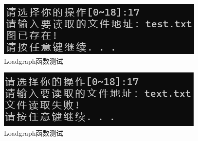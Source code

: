 \documentclass[supercite]{Experimental_Report}
\theoremstyle{definition}
\begin{document}
\begin{enumerate}
	\begin{figure}[H] %
		\begin{center}
			\includegraphics[width=0.5\linewidth]{images/graph/17-2.png}
			\caption{ Loadgraph函数测试}
			\label{fig2-15-3}
		\end{center}
	\end{figure}
	\begin{figure}[H] %
		\begin{center}
			\includegraphics[width=0.5\linewidth]{images/graph/17-3.png}
			\caption{ Loadgraph函数测试}
			\label{fig2-15-4}
		\end{center}
	\end{figure}


\end{enumerate}
\end{document}
